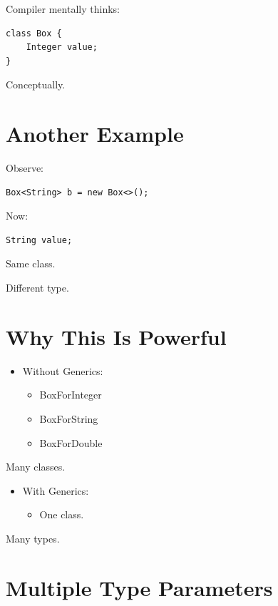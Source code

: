 \documentclass[11pt,a4paper]{book}
\begin{document}
Compiler mentally thinks:

\begin{verbatim} 
class Box {
    Integer value;
}
\end{verbatim}
Conceptually.

\section{Another Example}

Observe:

\begin{verbatim} 
Box<String> b = new Box<>();
\end{verbatim}

Now:

\begin{verbatim} 
String value;
\end{verbatim}

Same class.

Different type.

\section{Why This Is Powerful}

\begin{itemize}
\item[ ]Without Generics:
    \begin{itemize}
    \item[ ]BoxForInteger
    \item[ ]BoxForString
    \item[ ]BoxForDouble
    \end{itemize}
\end{itemize}
Many classes.
\begin{itemize}
\item [ ]With Generics:
    \begin{itemize}
    \item[ ]One class.
    \end{itemize}
\end{itemize}
Many types.

\section{Multiple Type Parameters}
\end{document}
